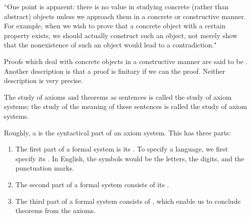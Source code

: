 \begin{remark}
``One point is apparent: there is no value in studying concrete (rather than abstract) objects unless we approach them in a concrete or constructive manner.
For example, when we wish to prove that a concrete object with a certain property exists, we should actually construct such an object, not merely show that the nonexistence of such an object would lead to a contradiction."
\end{remark}


Proofs which deal with concrete objects in a constructive manner are said to be .
Another description is that a proof is finitary if we can  the proof. Neither description is very precise.

The study of axioms and theorems as sentences is called the  study of axiom systems; the study of the meaning of these sentences is called the  study of axiom  systems.

\begin{shaded*}
Roughly, a  is the syntactical part of an axiom system. This has three parts:
\begin{enumerate}
    \item The first part of a formal system is its .
        To specify a language, we first specify its .
        In English, the symbols would be the letters, the digits, and the punctuation marks.
    \item The second part of a formal system consists of its .
    \item The third part of a formal system consists of , which enable us to conclude theorems from the axioms.
\end{enumerate}
\end{shaded*}

